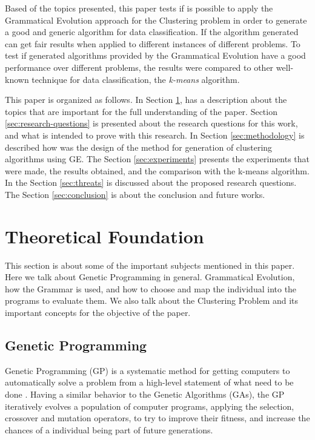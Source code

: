 \documentclass[journal]{IEEEtran}
\begin{document}
Based of the topics presented, this paper tests if is possible to apply the Grammatical Evolution approach for the Clustering problem in order to generate a good and generic algorithm for data classification. If the algorithm generated can get fair results when applied to different instances of different problems. To test if generated algorithms provided by the Grammatical Evolution have a good performance over different problems, the results were compared to other well-known technique for data classification, the \textit{k-means} algorithm.

This paper is organized as follows. In Section \ref{sec:theoretical_foudation}, has a description about the topics that are important for the full understanding of the paper. Section \ref{sec:research-questions} is presented about the research questions for this work, and what is intended to prove with this research. In Section \ref{sec:methodology} is described how was the design of the method for generation of clustering algorithms using GE. The Section \ref{sec:experiments} presents the experiments that were made, the results obtained, and the comparison with the k-means algorithm. In the Section \ref{sec:threats} is discussed about the proposed research questions. The Section \ref{sec:conclusion} is about the conclusion and future works.


\section{Theoretical Foundation} \label{sec:theoretical_foudation}

This section is about some of the important subjects mentioned in this paper. Here we talk about Genetic Programming in general. Grammatical Evolution, how the Grammar is used, and how to choose and map the individual into the programs to evaluate them. We also talk about the Clustering Problem and its important concepts for the objective of the paper.


\subsection{Genetic Programming}

Genetic Programming (GP) is a systematic method for getting computers to automatically solve a problem from a high-level statement of what need to be done \cite{koza2005genetic}. Having a similar behavior to the Genetic Algorithms (GAs), the GP iteratively evolves a population of computer programs, applying the selection, crossover and mutation operators, to try to improve their fitness, and increase the chances of a individual being part of future generations.
\end{document}
